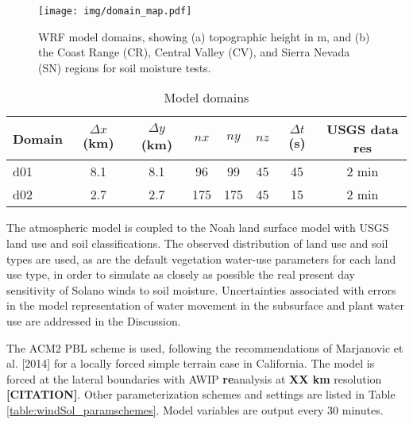 \begin{figure}[here]
\texttt{[image: img/domain\_map.pdf]}
\caption{WRF model domains, showing (a) topographic height in m, and (b) the Coast Range (CR), Central Valley (CV), and Sierra Nevada (SN) regions for soil moisture tests.}
\label{fig:windSol_domainmap}
\end{figure}

\begin{table}
\begin{tabular}{ l c c c c c c c }
\hline
Domain & $\Delta x$ (km) & $\Delta y$ (km) & $nx$ & $ny$ & $nz$ & $\Delta t$ (s) & USGS data res \\ \hline
d01 & 8.1 & 8.1 & 96 & 99 & 45 & 45 & 2 min\\
d02 & 2.7 & 2.7 & 175 & 175 & 45 & 15 & 2 min\\
\hline
\end{tabular}
\caption{Model domains}
\label{table:windSol_domains}
\end{table}

The atmospheric model is coupled to the Noah land surface model with USGS land use and soil classifications.  The observed distribution of land use and soil types are used, as are the default vegetation water-use parameters for each land use type, in order to simulate as closely as possible the real present day sensitivity of Solano winds to soil moisture.  Uncertainties associated with errors in the model representation of water movement in the subsurface and plant water use are addressed in the Discussion. 

The ACM2 PBL scheme is used, following the recommendations of Marjanovic et al. [2014] for a locally forced simple terrain case in California.  The model is forced at the lateral boundaries with AWIP \textbf{re}analysis at \textbf{XX km} resolution \textbf{[CITATION]}.  Other parameterization schemes and settings are listed in Table \ref{table:windSol_paramschemes}.  Model variables are output every 30 minutes.

